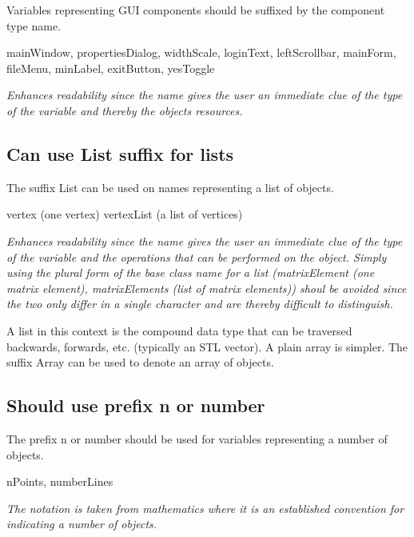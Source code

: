 \documentclass[a4paper,11pt,oneside]{scrbook}
\newcommand{\guideline}[1]{{\subsection{#1}}}
\newcommand{\motivation}[1]{{\normalfont \itshape #1}}
\newcommand{\trcode}[1]{{\normalfont \ttfamily #1}}
\begin{document}
Variables representing GUI components should be suffixed by the component type
name.

\begin{code}
  mainWindow, propertiesDialog, widthScale, loginText, leftScrollbar,
  mainForm, fileMenu, minLabel, exitButton, yesToggle
\end{code}

\motivation{ 
  Enhances readability since the name gives the user an immediate clue of the
  type of the variable and thereby the objects resources.
}

\guideline{Can use \trcode{List} suffix for lists}

The suffix \trcode{List} can be used on names representing a list of objects. 

\begin{code}
  vertex (one vertex)
  vertexList (a list of vertices) 
\end{code}

\motivation{ 
  Enhances readability since the name gives the user an immediate clue of the
  type of the variable and the operations that can be performed on the
  object. Simply using the plural form of the base class name for a list
  (matrixElement (one matrix element), matrixElements (list of matrix elements))
  shoul be avoided since the two only differ in a single character and are
  thereby difficult to distinguish.
}

A list in this context is the compound data type that can be traversed
backwards, forwards, etc. (typically an STL vector). A plain array is
simpler. The suffix \trcode{Array} can be used to denote an array of objects.
  
\guideline{Should use prefix \trcode{n} or \trcode{number}}

The prefix \trcode{n} or \trcode{number} should be used for variables
representing a number of objects.

\begin{code}
  nPoints, numberLines 
\end{code}

\motivation{ 
  The notation is taken from mathematics where it is an established convention
  for indicating a number of objects.
}
\end{document}
